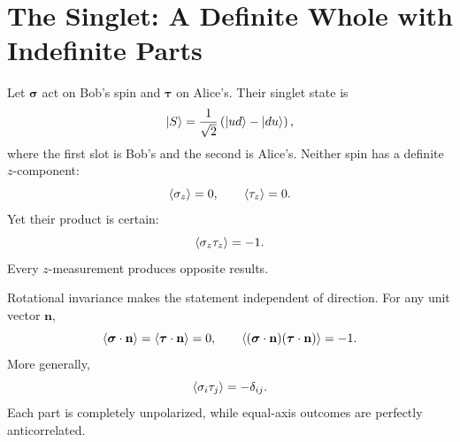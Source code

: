 \begin{classroomqa}
\end{classroomqa}

\begin{classroomqa}
\end{classroomqa}

\section{The Singlet: A Definite Whole with Indefinite Parts}

Let \(\boldsymbol{\sigma}\) act on Bob's spin and \(\boldsymbol{\tau}\) on Alice's. Their singlet state is
\begin{equation}
\left\lvert S\right\rangle
=\frac{1}{\sqrt2}
\left(\left\lvert u d\right\rangle-\left\lvert d u\right\rangle\right),
\label{eq:l7-singlet}
\end{equation}
where the first slot is Bob's and the second is Alice's. Neither spin has a definite \(z\)-component:
\begin{equation}
\left\langle\sigma_z\right\rangle=0,
\qquad
\left\langle\tau_z\right\rangle=0.
\label{eq:l7-singlet-local-z}
\end{equation}
Yet their product is certain:
\begin{equation}
\left\langle\sigma_z\tau_z\right\rangle=-1.
\label{eq:l7-singlet-product-z}
\end{equation}
Every \(z\)-measurement produces opposite results.

Rotational invariance makes the statement independent of direction. For any unit vector \(\mathbf n\),
\begin{equation}
\left\langle\boldsymbol{\sigma}\cdot\mathbf n\right\rangle
=\left\langle\boldsymbol{\tau}\cdot\mathbf n\right\rangle=0,
\qquad
\left\langle
(\boldsymbol{\sigma}\cdot\mathbf n)
(\boldsymbol{\tau}\cdot\mathbf n)
\right\rangle=-1.
\label{eq:l7-singlet-any-axis}
\end{equation}
More generally,
\begin{equation}
\left\langle\sigma_i\tau_j\right\rangle=-\delta_{ij}.
\label{eq:l7-singlet-correlation-tensor}
\end{equation}
Each part is completely unpolarized, while equal-axis outcomes are perfectly anticorrelated.

